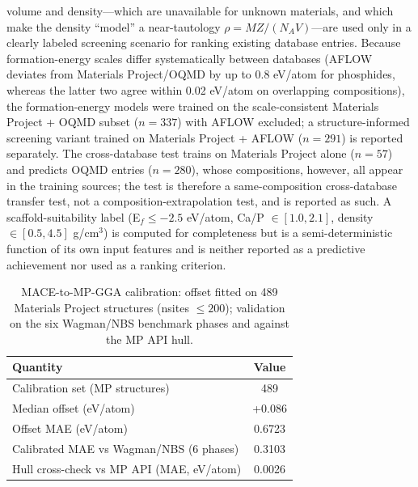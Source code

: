 \documentclass[review,11pt,a4paper]{elsarticle}
\begin{document}
volume and density---which are unavailable for unknown materials, and which make the density ``model'' a near-tautology $\rho = MZ/(N_A V)$---are used only in a clearly labeled screening scenario for ranking existing database entries. Because formation-energy scales differ systematically between databases (AFLOW deviates from Materials Project/OQMD by up to 0.8 eV/atom for phosphides, whereas the latter two agree within 0.02 eV/atom on overlapping compositions), the formation-energy models were trained on the scale-consistent Materials Project + OQMD subset ($n=337$) with AFLOW excluded; a structure-informed screening variant trained on Materials Project + AFLOW ($n=291$) is reported separately. The cross-database test trains on Materials Project alone ($n=57$) and predicts OQMD entries ($n=280$), whose compositions, however, all appear in the training sources; the test is therefore a same-composition cross-database transfer test, not a composition-extrapolation test, and is reported as such. A scaffold-suitability label (E$_f \leq -2.5$ eV/atom, Ca/P $\in [1.0, 2.1]$, density $\in [0.5, 4.5]$ g/cm$^3$) is computed for completeness but is a semi-deterministic function of its own input features and is neither reported as a predictive achievement nor used as a ranking criterion.

\begin{table}[ht]
\centering\small
\caption{MACE-to-MP-GGA calibration: offset fitted on 489 Materials Project structures (nsites $\leq 200$); validation on the six Wagman/NBS benchmark phases and against the MP API hull.}
\label{tab:kalibrasi}
\begin{tabular}{lc}
\toprule
Quantity & Value \\
\midrule
Calibration set (MP structures) & 489 \\
Median offset (eV/atom) & +0.086 \\
Offset MAE (eV/atom) & 0.6723 \\
Calibrated MAE vs Wagman/NBS (6 phases) & 0.3103 \\
Hull cross-check vs MP API (MAE, eV/atom) & 0.0026 \\
\bottomrule
\end{tabular}
\end{table}
\end{document}
